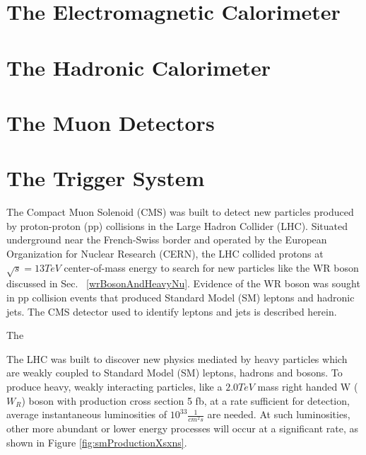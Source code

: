 \section{The Electromagnetic Calorimeter}
\label{sec:ecalDescription}




\section{The Hadronic Calorimeter}
\label{sec:hcalDescription}


\section{The Muon Detectors}
\label{sec:muonDetectorsDescription}

\section{The Trigger System}
\label{sec:triggerDescription}




The Compact Muon Solenoid (CMS) was built to detect new particles produced by proton-proton (pp) collisions 
in the Large Hadron Collider (LHC).  Situated underground near the French-Swiss border and
operated by the European Organization for Nuclear Research (CERN), the LHC collided protons at
$\sqrt{s} = 13 TeV$ center-of-mass energy to search for new particles like the WR boson discussed 
in Sec. ~\ref{wrBosonAndHeavyNu}.  Evidence of the WR boson was sought in pp collision events that
produced Standard Model (SM) leptons and hadronic jets.  The CMS detector used to identify leptons and
jets is described herein.

The

The LHC was built to discover new physics mediated by heavy particles which are weakly coupled to Standard Model (SM)
leptons, hadrons and bosons.  To produce heavy, weakly interacting particles, like a $2.0 TeV$ mass right handed W ($W_{R}$) boson
with production cross section 5 fb, at a rate sufficient for detection, average instantaneous luminosities of
$10^{33} \frac{1}{cm^{2}s}$ are needed.  At such luminosities, other more abundant or lower energy processes will occur
at a significant rate, as shown in Figure \ref{fig:smProductionXsxns}.

